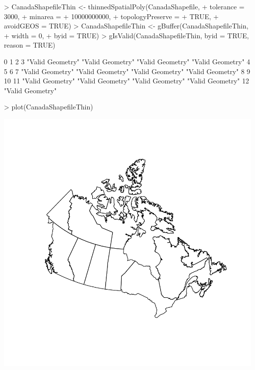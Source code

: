 \documentclass[12pt,letterpaper,final]{article}
\begin{document}
\begin{enumerate}
\begin{enumerate}
\begin{Schunk}
\begin{Sinput}
> CanadaShapefileThin <- thinnedSpatialPoly(CanadaShapefile, 
+                                          tolerance = 3000,
+                                          minarea =
+                                            10000000000,
+                                          topologyPreserve =
+                                            TRUE, 
+                                          avoidGEOS = TRUE)
> CanadaShapefileThin <- gBuffer(CanadaShapefileThin, 
+                                width = 0, 
+                                byid = TRUE)
> gIsValid(CanadaShapefileThin, byid = TRUE, reason = TRUE)
\end{Sinput}
\begin{Soutput}
               0                1                2                3 
"Valid Geometry" "Valid Geometry" "Valid Geometry" "Valid Geometry" 
               4                5                6                7 
"Valid Geometry" "Valid Geometry" "Valid Geometry" "Valid Geometry" 
               8                9               10               11 
"Valid Geometry" "Valid Geometry" "Valid Geometry" "Valid Geometry" 
              12 
"Valid Geometry" 
\end{Soutput}
\begin{Sinput}
> plot(CanadaShapefileThin)
\end{Sinput}
\end{Schunk}
\includegraphics{hw03_bartschi-002}


\end{enumerate}
\end{enumerate}
\end{document}

